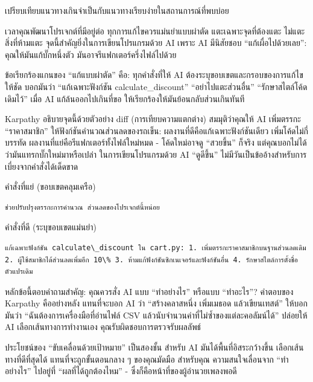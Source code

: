 \begin{center}\small\color{gray}เปรียบเทียบแนวทางเกินจำเป็นกับแนวทางเรียบง่ายในสถานการณ์ที่พบบ่อย\end{center}


เวลาคุณพัฒนาโปรเจกต์ที่มีอยู่ต่อ ทุกการแก้ไขควรแม่นยำแบบผ่าตัด แตะเฉพาะจุดที่ต้องแตะ ไม่แตะสิ่งที่ห้ามแตะ จุดนี้สำคัญยิ่งในการเขียนโปรแกรมด้วย AI เพราะ AI มีนิสัยชอบ “แก้เผื่อไปด้วยเลย”: คุณให้มันแก้บั๊กหนึ่งตัว มันอาจรีแฟกเตอร์ครึ่งไฟล์ไปด้วย

ข้อเรียกร้องแกนของ “แก้แบบผ่าตัด” คือ: ทุกคำสั่งที่ให้ AI ต้องระบุขอบเขตและกรอบของการแก้ไขให้ชัด บอกมันว่า “แก้เฉพาะฟังก์ชัน calculate\_discount” “อย่าไปแตะส่วนอื่น” “รักษาสไตล์โค้ดเดิมไว้” เมื่อ AI แก้ล้นออกไปเกินที่ขอ ให้เรียกร้องให้มันย้อนกลับส่วนเกินทันที

Karpathy อธิบายจุดนี้ด้วยตัวอย่าง diff (การเทียบความแตกต่าง) สมมุติว่าคุณให้ AI เพิ่มตรรกะ “ราคาสมาชิก” ให้ฟังก์ชันคำนวณส่วนลดของรถเข็น: ผลงานที่ดีคือแก้เฉพาะฟังก์ชันเดียว เพิ่มโค้ดไม่กี่บรรทัด ผลงานที่แย่คือรีแฟกเตอร์ทั้งไฟล์ใหม่หมด - โค้ดใหม่อาจดู “สวยขึ้น” ก็จริง แต่คุณบอกไม่ได้ว่ามันแทรกบั๊กใหม่มาหรือเปล่า ในการเขียนโปรแกรมด้วย AI “ดูดีขึ้น” ไม่มีวันเป็นข้ออ้างสำหรับการเบี่ยงจากคำสั่งได้เด็ดขาด

คำสั่งที่แย่ (ขอบเขตคลุมเครือ)

\begin{lstlisting}
ช่วยปรับปรุงตรรกะการคำนวณ ส่วนลดของโปรเจกต์นี้หน่อย
\end{lstlisting}

คำสั่งที่ดี (ระบุขอบเขตแม่นยำ)

\begin{lstlisting}
แก้เฉพาะฟังก์ชัน calculate\_discount ใน cart.py: 1. เพิ่มตรรกะราคาสมาชิกบนฐานส่วนลดเดิม 2. ผู้ใช้สมาชิกได้ส่วนลดเพิ่มอีก 10\% 3. ห้ามแก้ฟังก์ชันซิกเนเจอร์และฟังก์ชันอื่น 4. รักษาสไตล์การตั้งชื่อตัวแปรเดิม
\end{lstlisting}


หลักข้อนี้ตอบคำถามสำคัญ: คุณควรสั่ง AI แบบ “ทำอย่างไร” หรือแบบ “ทำอะไร”? คำตอบของ Karpathy คืออย่างหลัง แทนที่จะบอก AI ว่า “สร้างคลาสหนึ่ง เพิ่มเมธอด แล้วเขียนเทสต์” ให้บอกมันว่า “ฉันต้องการเครื่องมือที่อ่านไฟล์ CSV แล้วนับจำนวนค่าที่ไม่ซ้ำของแต่ละคอลัมน์ได้” ปล่อยให้ AI เลือกเส้นทางการทำงานเอง คุณรับผิดชอบการตรวจรับผลลัพธ์

ประโยชน์ของ “ขับเคลื่อนด้วยเป้าหมาย” เป็นสองชั้น สำหรับ AI มันได้พื้นที่อิสระกว้างขึ้น เลือกเส้นทางที่ดีที่สุดได้ แทนที่จะถูกขั้นตอนกลาง ๆ ของคุณมัดมือ สำหรับคุณ ความสนใจเลื่อนจาก “ทำอย่างไร” ไปอยู่ที่ “ผลที่ได้ถูกต้องไหม” - ซึ่งก็คือหน้าที่ของผู้อำนวยเพลงพอดี

